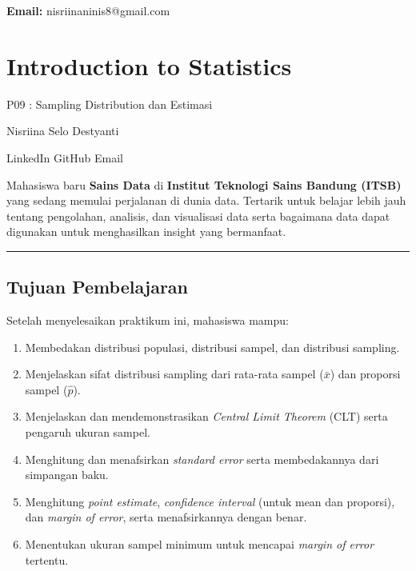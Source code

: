 \documentclass[
  indonesian,
  letterpaper,
]{book}
\providecommand{\tightlist}{%
  \setlength{\itemsep}{0pt}\setlength{\parskip}{0pt}}
\begin{document}
\textbf{Email:} nisriinaninis8@gmail.com


\chapter{Introduction to Statistics}\label{introduction-to-statistics}

P09 : Sampling Distribution dan Estimasi

\hfill\break

Nisriina Selo Destyanti

LinkedIn {\textbar{}} GitHub {\textbar{}} Email

Mahasiswa baru \textbf{Sains Data} di \textbf{Institut Teknologi Sains
Bandung (ITSB)} yang sedang memulai perjalanan di dunia data. Tertarik
untuk belajar lebih jauh tentang pengolahan, analisis, dan visualisasi
data serta bagaimana data dapat digunakan untuk menghasilkan insight
yang bermanfaat.

\begin{center}\rule{0.5\linewidth}{0.5pt}\end{center}

\section{Tujuan Pembelajaran}\label{tujuan-pembelajaran}

Setelah menyelesaikan praktikum ini, mahasiswa mampu:

\begin{enumerate}
\def\labelenumi{\arabic{enumi}.}
\tightlist
\item
  Membedakan distribusi populasi, distribusi sampel, dan distribusi
  sampling.
\item
  Menjelaskan sifat distribusi sampling dari rata-rata sampel
  (\(\bar{x}\)) dan proporsi sampel (\(\hat{p}\)).
\item
  Menjelaskan dan mendemonstrasikan \emph{Central Limit Theorem} (CLT)
  serta pengaruh ukuran sampel.
\item
  Menghitung dan menafsirkan \emph{standard error} serta membedakannya
  dari simpangan baku.
\item
  Menghitung \emph{point estimate}, \emph{confidence interval} (untuk
  mean dan proporsi), dan \emph{margin of error}, serta menafsirkannya
  dengan benar.
\item
  Menentukan ukuran sampel minimum untuk mencapai \emph{margin of error}
  tertentu.
\end{enumerate}
\end{document}
